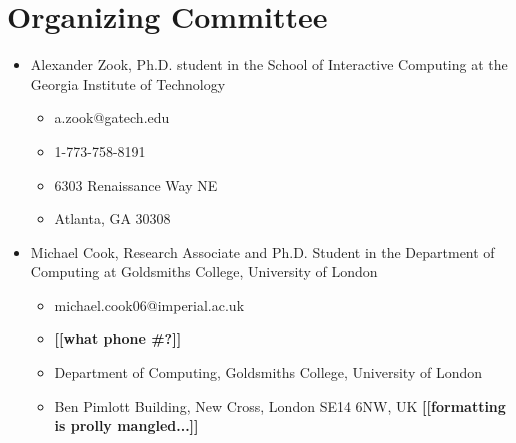 \documentclass[10pt,a4paper]{article}
\newcommand{\mytodo}[1]{\textbf{[[#1]]}}
\begin{document}
\section{Organizing Committee}
\begin{itemize}
\item Alexander Zook, Ph.D. student in the School of Interactive Computing at the Georgia Institute of Technology
\begin{itemize}
\item a.zook@gatech.edu
\item 1-773-758-8191
\item 6303 Renaissance Way NE
\item Atlanta, GA 30308
\end{itemize}
\item Michael Cook, Research Associate and Ph.D. Student in the Department of Computing at Goldsmiths College, University of London
\begin{itemize}
\item michael.cook06@imperial.ac.uk
\item \mytodo{what phone \#?}
\item Department of Computing, Goldsmiths College, University of London
\item Ben Pimlott Building, New Cross, London SE14 6NW, UK \mytodo{formatting is prolly mangled...}
\end{itemize}
\end{itemize}
\end{document}
